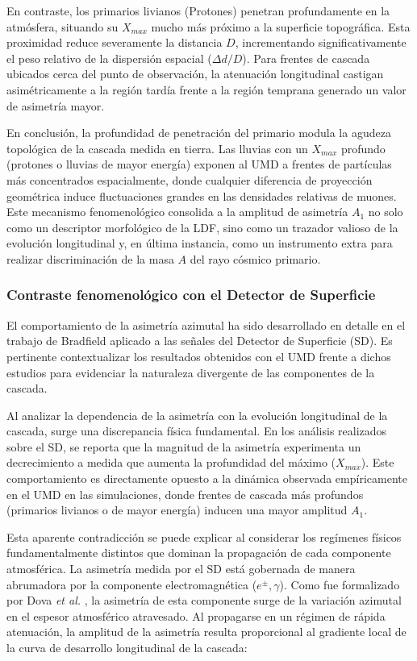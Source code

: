En contraste, los primarios livianos (Protones) penetran profundamente en la atmósfera, situando su $X_{max}$ mucho más próximo a la superficie topográfica. Esta proximidad reduce severamente la distancia $D$, incrementando significativamente el peso relativo de la dispersión espacial ($\Delta d / D$). Para frentes de cascada ubicados cerca del punto de observación, la atenuación longitudinal castigan asimétricamente a la región tardía frente a la región temprana generado un valor de asimetría mayor.

En conclusión, la profundidad de penetración del primario modula la agudeza topológica de la cascada medida en tierra. Las lluvias con un $X_{max}$ profundo (protones o lluvias de mayor energía) exponen al UMD a frentes de partículas más concentrados espacialmente, donde cualquier diferencia de proyección geométrica induce fluctuaciones grandes en las densidades relativas de muones. Este mecanismo fenomenológico consolida a la amplitud de asimetría $A_1$ no solo como un descriptor morfológico de la LDF, sino como un trazador valioso de la evolución longitudinal y, en última instancia, como un instrumento extra para realizar discriminación de la masa $A$ del rayo cósmico primario.

\subsubsection{Contraste fenomenológico con el Detector de Superficie}
\label{subsec:contraste_sd_bradfield}

El comportamiento de la asimetría azimutal ha sido desarrollado en detalle en el trabajo de Bradfield \cite{BradfieldThesis} aplicado a las señales del Detector de Superficie (SD). Es pertinente contextualizar los resultados obtenidos con el UMD frente a dichos estudios para evidenciar la naturaleza divergente de las componentes de la cascada.

Al analizar la dependencia de la asimetría con la evolución longitudinal de la cascada, surge una discrepancia física fundamental. En los análisis realizados sobre el SD, se reporta que la magnitud de la asimetría experimenta un decrecimiento a medida que aumenta la profundidad del máximo ($X_{max}$). Este comportamiento es directamente opuesto a la dinámica observada empíricamente en el UMD en las simulaciones, donde frentes de cascada más profundos (primarios livianos o de mayor energía) inducen una mayor amplitud $A_1$.

Esta aparente contradicción se puede explicar al considerar los regímenes físicos fundamentalmente distintos que dominan la propagación de cada componente atmosférica. La asimetría medida por el SD está gobernada de manera abrumadora por la componente electromagnética ($e^\pm, \gamma$). Como fue formalizado por Dova \textit{et al.} \cite{dova2003}, la asimetría de esta componente surge de la variación azimutal en el espesor atmosférico atravesado. Al propagarse en un régimen de rápida atenuación, la amplitud de la asimetría resulta proporcional al gradiente local de la curva de desarrollo longitudinal de la cascada:

